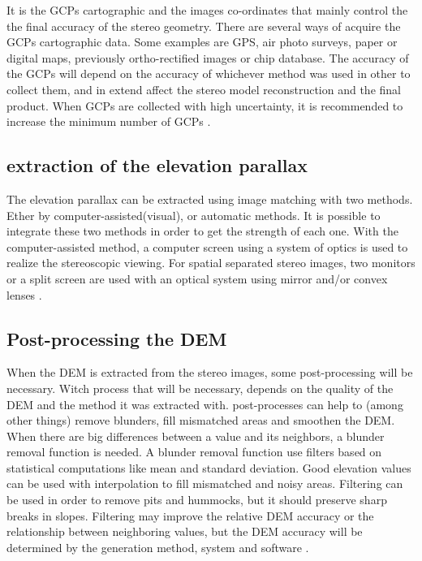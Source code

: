 \documentclass[a4paper,UKenglish]{article}
\begin{document}
It is the GCPs cartographic and the images co-ordinates that mainly control the the final accuracy of the stereo geometry. There are several ways of acquire the GCPs cartographic data. Some examples are GPS, air photo surveys, paper or digital maps, previously ortho-rectified images or chip database. The accuracy of the GCPs will depend on the accuracy of whichever method was used in other to collect them, and in extend affect the stereo model reconstruction and the final product. When GCPs are collected with high uncertainty, it is recommended to increase the minimum number of GCPs \citep{toutin01}.

\subsection{extraction of the elevation parallax}

The elevation parallax can be extracted using image matching with two methods. Ether by computer-assisted(visual), or automatic methods. It is possible to integrate these two methods in order to get the strength of each one. With the computer-assisted method, a computer screen using a system of optics is used to realize the stereoscopic viewing. For spatial separated stereo images, two monitors or a split screen are used with an optical system using mirror and/or convex lenses \citep{toutin01}.


\subsection{Post-processing the DEM}

When the DEM is extracted from the stereo images, some post-processing will be necessary. Witch process that will be necessary, depends on the quality of the DEM and the method it was extracted with. post-processes can help to (among other things) remove blunders, fill mismatched areas and smoothen the DEM. When there are big differences between a value and its neighbors, a blunder removal function is needed. A blunder removal function use filters based on statistical computations like mean and standard deviation. Good elevation values can be used with interpolation to fill mismatched and noisy areas. Filtering can be used in order to remove pits and hummocks, but it should preserve sharp breaks in slopes. Filtering may improve the relative DEM accuracy or the relationship between neighboring values, but the DEM accuracy will be determined by the generation method, system and software \citep{toutin01}.
\end{document}
